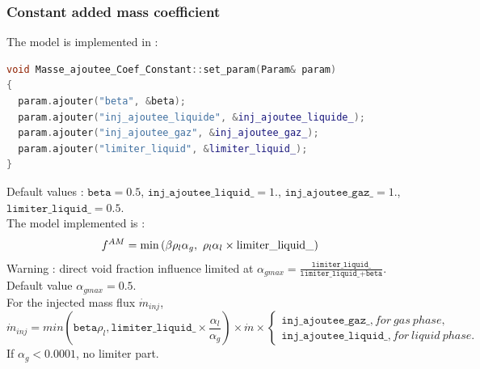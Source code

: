 %
\subsubsection{Constant added mass coefficient}
The model is implemented in :
\begin{lstlisting}[language=c++]
void Masse_ajoutee_Coef_Constant::set_param(Param& param)
{
  param.ajouter("beta", &beta);
  param.ajouter("inj_ajoutee_liquide", &inj_ajoutee_liquide_);
  param.ajouter("inj_ajoutee_gaz", &inj_ajoutee_gaz_);
  param.ajouter("limiter_liquid", &limiter_liquid_);
}
\end{lstlisting}
Default values : $\texttt{beta}=0.5$, $\texttt{inj\_ajoutee\_liquid\_}=1.$, $\texttt{inj\_ajoutee\_gaz\_}=1.$, $\texttt{limiter\_liquid\_} = 0.5$.\\
The model implemented is :
\begin{equation}
   f^{AM}=\min\parent{\beta \rho_l\alpha_g,\ \rho_l\alpha_l\times{}\text{limiter\_liquid\_}}
\end{equation}
{\color{red} Warning} : direct void fraction influence limited at $\alpha_{gmax}=\frac{\texttt{limiter\_liquid\_}}{\texttt{limiter\_liquid\_}+\texttt{beta}}$. Default value $\alpha_{gmax}=0.5$.\\
For the injected mass flux $\dot{m}_{inj}$,
\begin{equation}
   \dot{m}_{inj}=min(\texttt{beta}\rho_l,\texttt{limiter\_liquid\_}\times \frac{\alpha_l}{\alpha_g})\times\dot{m}\times{}\begin{cases} \texttt{inj\_ajoutee\_gaz\_}, for\ gas\ phase,\\ \texttt{inj\_ajoutee\_liquid\_}, for\ liquid\ phase.
   \end{cases}
\end{equation}
If $\alpha_g< 0.0001$, no limiter part.

%
